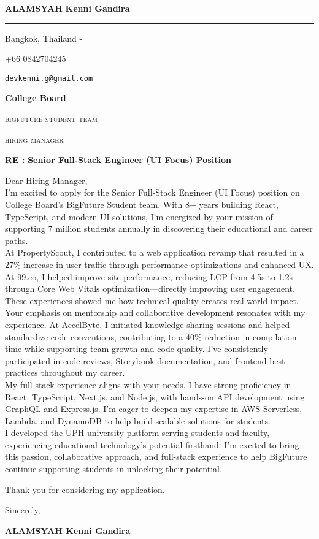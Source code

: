 \documentclass[12pt]{article}
\newcommand{\firstname}{Kenni Gandira}
\newcommand{\lastname}{Alamsyah}
\newcommand{\mainColor}{redBlood} %
\newlength{\spacebox}
\newcommand{\shspace}{\hspace*{0.8em}}
\newcommand{\xvspace}{\vspace*{0.1em}}
\newcommand{\svspace}{\vspace*{0.5em}}
\newcommand{\mvspace}{\vspace*{1.5em}}
\newcommand{\hvspace}{\vspace*{2.5em}}
\newcommand{\negmvspace}{\vspace*{-1em}}
\newcommand{\userInfo}[4]{
    \begin{flushleft}
        \color{\mainColor}
        \Huge
        \textbf{\MakeUppercase{\lastname}}
        \color{black}
        \textbf{\firstname}
        \color{\mainColor}
        \noindent\rule{19.1cm}{0.8pt}
        \color{grayShy}
        \small
        \par
        \parbox{7\spacebox} {
            \faMap \shspace #1 - #2 \par \svspace
            \faPhone \shspace #3 \par \svspace
            \faEnvelopeOpen \shspace \texttt{#4} \par \svspace
        }
        \color{\mainColor}
        \mvspace
    \end{flushleft}
    \negmvspace
}
\newcommand{\companyInfo}[4]{
    \begin{flushright}
        \parbox{4\spacebox}{
            \raggedleft
            \small
            \textbf{#1}\par
            \mvspace
            \color{grayShy} \textsc{\MakeLowercase{#2}}\par
            \xvspace
            \textsc{\MakeLowercase{#3}}\par
            \xvspace
            \textsc{\MakeLowercase{#4}}\par
            \color{black}
        }
    \end{flushright}
    \hvspace
}
\newcommand{\object}[1]{
    \small
    \color{\mainColor} \textbf{RE :} \color{black} \textbf{#1} \par
}
\newcommand{\content}[2]{
    \mvspace
    \begin{flushleft}
        \parbox{10.3\spacebox}{
          #1\par
          \svspace
          #2
        }\par
    \end{flushleft}
}
\newcommand{\signature}{
    \svspace
    \parbox{3\spacebox}{
      Sincerely,\par
      \svspace \hspace{-0.3em}
      \textbf{\color{\mainColor} \MakeUppercase{\lastname} \color{black} \firstname}\par
      \svspace \svspace
      \Huge \faPenNib\par
    }\par
}
\begin{document}
\selectfont
\userInfo{Bangkok, Thailand}{}{+66 0842704245}{devkenni.g@gmail.com}
\companyInfo{College Board}{BigFuture Student Team}{Hiring Manager}{}
\object{Senior Full-Stack Engineer (UI Focus) Position}
\content{
  Dear Hiring Manager, \\

  I'm excited to apply for the Senior Full-Stack Engineer (UI Focus) position on College Board's BigFuture Student team. With 8+ years building React, TypeScript, and modern UI solutions, I'm energized by your mission of supporting 7 million students annually in discovering their educational and career paths. \\

  At PropertyScout, I contributed to a web application revamp that resulted in a 27\% increase in user traffic through performance optimizations and enhanced UX. At 99.co, I helped improve site performance, reducing LCP from 4.5s to 1.2s through Core Web Vitals optimization—directly improving user engagement. These experiences showed me how technical quality creates real-world impact. \\

  Your emphasis on mentorship and collaborative development resonates with my experience. At AccelByte, I initiated knowledge-sharing sessions and helped standardize code conventions, contributing to a 40\% reduction in compilation time while supporting team growth and code quality. I've consistently participated in code reviews, Storybook documentation, and frontend best practices throughout my career. \\

  My full-stack experience aligns with your needs. I have strong proficiency in React, TypeScript, Next.js, and Node.js, with hands-on API development using GraphQL and Express.js. I'm eager to deepen my expertise in AWS Serverless, Lambda, and DynamoDB to help build scalable solutions for students. \\

  I developed the UPH university platform serving students and faculty, experiencing educational technology's potential firsthand. I'm excited to bring this passion, collaborative approach, and full-stack experience to help BigFuture continue supporting students in unlocking their potential.\\
}{Thank you for considering my application.}
\signature
\end{document}

